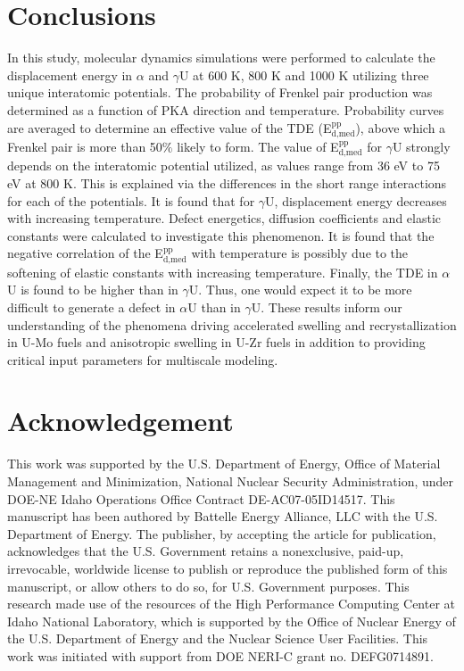 \documentclass[review]{elsarticle}
\begin{document}
\section{Conclusions}

In this study, molecular dynamics simulations were performed to calculate the displacement energy in $\alpha$ and $\gamma$U at 600 K, 800 K and 1000 K utilizing three unique interatomic potentials. The probability of Frenkel pair production was determined as a function of PKA direction and temperature. Probability curves are averaged to determine an effective value of the TDE (E$^{\textrm{pp}}_{\textrm{d,med}}$), above which a Frenkel pair is more than 50$\%$ likely to form. The value of E$^{\textrm{pp}}_{\textrm{d,med}}$ for $\gamma$U strongly depends on the interatomic potential utilized, as values range from 36 eV to 75 eV at 800 K. This is explained via the differences in the short range interactions for each of the potentials. It is found that for $\gamma$U, displacement energy decreases with increasing temperature. Defect energetics, diffusion coefficients and elastic constants were calculated to investigate this phenomenon. It is found that the negative correlation of the E$^{\textrm{pp}}_{\textrm{d,med}}$ with temperature is possibly due to the softening of elastic constants with increasing temperature. Finally, the TDE in $\alpha$U is found to be higher than in $\gamma$U. Thus, one would expect it to be more difficult to generate a defect in $\alpha$U than in $\gamma$U. These results inform our understanding of the phenomena driving accelerated swelling and recrystallization in U-Mo fuels and anisotropic swelling in U-Zr fuels in addition to providing critical input parameters for multiscale modeling.

\section{Acknowledgement}
This work was supported by the U.S. Department of Energy, Office of Material Management and Minimization, National Nuclear Security Administration, under DOE-NE Idaho Operations Office Contract DE-AC07-05ID14517. This manuscript has been authored by Battelle Energy Alliance, LLC with the U.S. Department of Energy. The publisher, by accepting the article for publication, acknowledges that the U.S. Government retains a nonexclusive, paid-up, irrevocable, worldwide license to publish or reproduce the published form of this manuscript, or allow others to do so, for U.S. Government purposes. This research made use of the resources of the High Performance Computing Center at Idaho National Laboratory, which is supported by the Office of Nuclear Energy of the U.S. Department of Energy and the Nuclear Science User Facilities. This work was initiated with support from DOE NERI-C grant no. DEFG0714891.


\end{document}
